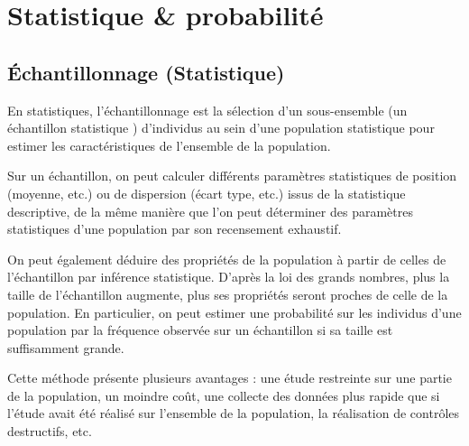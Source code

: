 		
		
		
	\section{Statistique \& probabilité}

	\subsection{Échantillonnage (Statistique)}
	
	En statistiques, l'échantillonnage est la sélection d'un sous-ensemble (un échantillon statistique ) d'individus au sein d'une population statistique pour estimer les caractéristiques de l'ensemble de la population. 
	
	
	Sur un échantillon, on peut calculer différents paramètres statistiques de position (moyenne, etc.) ou de dispersion (écart type, etc.) issus de la statistique descriptive, de la même manière que l'on peut déterminer des paramètres statistiques d'une population par son recensement exhaustif.
	
	On peut également déduire des propriétés de la population à partir de celles de l'échantillon par inférence statistique. D'après la loi des grands nombres, plus la taille de l'échantillon augmente, plus ses propriétés seront proches de celle de la population. En particulier, on peut estimer une probabilité sur les individus d'une population par la fréquence observée sur un échantillon si sa taille est suffisamment grande. 
	
	Cette méthode présente plusieurs avantages : une étude restreinte sur une partie de la population, un moindre coût, une collecte des données plus rapide que si l'étude avait été réalisé sur l'ensemble de la population, la réalisation de contrôles destructifs, etc.
	

